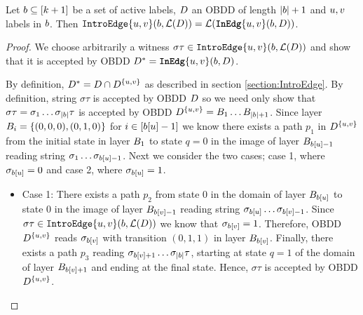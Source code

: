 \begin{lemma}
\label{lemma:SymbolicEdgeAppendix}
Let $b \subseteq [k+1]$ be a set of active labels, $D$ an OBDD of length $|b|+1$ and $u, v$ labels in $b$. Then  $\texttt{IntroEdge}\{u,v\}(b, \mathcal{L}(D))  = \mathcal{L}(\texttt{\textbf{InEdg}}\{u,v\}(b, D))$.
\end{lemma}

\begin{proof}
    We choose arbitrarily a  witness $\sigma\tau \in \texttt{IntroEdge}\{u,v\}(b,\mathcal{L}(D))$ and show that it is accepted by OBDD $D^* = \texttt{\textbf{InEdg}}\{u,v\}(b,D)$.

    By definition, $D^* = D \cap D^{\{u,v\}}$ as described in section \ref{section:IntroEdge}. By definition, string $\sigma\tau$ is accepted by OBDD $D$ so we need only show that $\sigma\tau = \sigma_1\dots \sigma_{|b|}\tau$ is accepted by OBDD $D^{\{u,v\}} = B_1\dots B_{|b|+1}$. Since layer $B_i = \{(0,0,0), (0,1,0)\}$ for $i \in [b[u]-1]$ we know there exists a path $p_1$ in $D^{\{u,v\}}$ from the initial state in layer $B_1$ to state $q = 0$ in the image of layer $B_{b[u]-1}$ reading string $\sigma_1\dots \sigma_{b[u]-1}$. Next we consider the two cases; case 1, where $\sigma_{b[u]} = 0$ and case 2, where $\sigma_{b[u]} = 1$.

    \begin{itemize}
        \item Case 1: There exists a path $p_2$ from state $0$ in the domain of layer $B_{b[u]}$ to state $0$ in the image of layer $B_{b[v]-1}$ reading string $\sigma_{b[u]}\dots \sigma_{b[v]-1}$. Since $\sigma\tau \in \texttt{IntroEdge}\{u,v\}(b,\mathcal{L}(D))$ we know that $\sigma_{b[v]} = 1$. Therefore, OBDD $D^{\{u,v\}}$ reads $\sigma_{b[v]}$ with transition $(0,1,1)$ in layer $B_{b[v]}$. Finally, there exists a path $p_3$ reading $\sigma_{b[v] + 1}\dots \sigma_{|b|}\tau$, starting at state $q=1$ of the domain of layer $B_{b[v] + 1}$ and ending at the final state. Hence, $\sigma\tau$ is accepted by OBDD $D^{\{u,v\}}$.
        

\end{itemize}
\end{proof}

